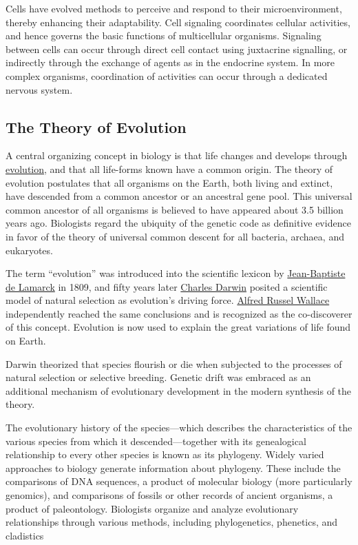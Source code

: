 Cells have evolved methods to perceive and respond to their microenvironment, thereby enhancing their adaptability. Cell signaling coordinates cellular activities, and hence governs the basic functions of multicellular organisms. Signaling between cells can occur through direct cell contact using juxtacrine signalling, or indirectly through the exchange of agents as in the endocrine system. In more complex organisms, coordination of activities can occur through a dedicated nervous system.

\hypertarget{the-theory-of-evolution}{%
\subsection{The Theory of Evolution}\label{the-theory-of-evolution}}

A central organizing concept in biology is that life changes and develops through \href{https://en.wikipedia.org/wiki/Evolution}{evolution}, and that all life-forms known have a common origin. The theory of evolution postulates that all organisms on the Earth, both living and extinct, have descended from a common ancestor or an ancestral gene pool. This universal common ancestor of all organisms is believed to have appeared about 3.5 billion years ago. Biologists regard the ubiquity of the genetic code as definitive evidence in favor of the theory of universal common descent for all bacteria, archaea, and eukaryotes.

The term ``evolution'' was introduced into the scientific lexicon by \href{https://en.wikipedia.org/wiki/Jean-Baptiste_Lamarck}{Jean-Baptiste de Lamarck} in 1809, and fifty years later \href{https://en.wikipedia.org/wiki/Charles_Darwin}{Charles Darwin} posited a scientific model of natural selection as evolution's driving force. \href{https://en.wikipedia.org/wiki/Alfred_Russel_Wallace}{Alfred Russel Wallace} independently reached the same conclusions and is recognized as the co-discoverer of this concept. Evolution is now used to explain the great variations of life found on Earth.

Darwin theorized that species flourish or die when subjected to the processes of natural selection or selective breeding. Genetic drift was embraced as an additional mechanism of evolutionary development in the modern synthesis of the theory.

The evolutionary history of the species---which describes the characteristics of the various species from which it descended---together with its genealogical relationship to every other species is known as its phylogeny. Widely varied approaches to biology generate information about phylogeny. These include the comparisons of DNA sequences, a product of molecular biology (more particularly genomics), and comparisons of fossils or other records of ancient organisms, a product of paleontology. Biologists organize and analyze evolutionary relationships through various methods, including phylogenetics, phenetics, and cladistics

